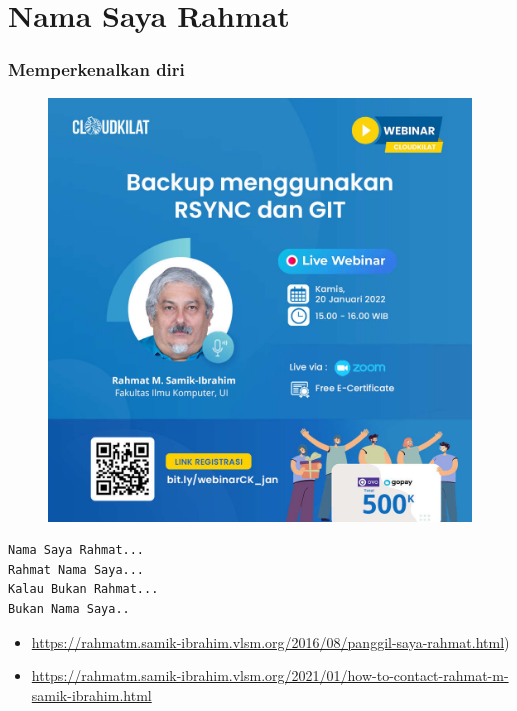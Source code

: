 \documentclass[xcolor=table, notheorems, hyperref={pdfpagelabels=false}]{beamer}
\begin{document}
\section{Nama Saya Rahmat}
\begin{frame}[fragile]
\frametitle{Memperkenalkan diri}
\begin{figure}
\includegraphics[width=0.41\linewidth]{JPG-012}
\end{figure}
\begin{lstlisting}[basicstyle=\ttfamily\large]
Nama Saya Rahmat...
Rahmat Nama Saya...
Kalau Bukan Rahmat...
Bukan Nama Saya..
\end{lstlisting}
{\tiny
\begin{itemize}
\item \url{https://rahmatm.samik-ibrahim.vlsm.org/2016/08/panggil-saya-rahmat.html})
\item \url{https://rahmatm.samik-ibrahim.vlsm.org/2021/01/how-to-contact-rahmat-m-samik-ibrahim.html}
\end{itemize}
}
\end{frame}

\end{document}
